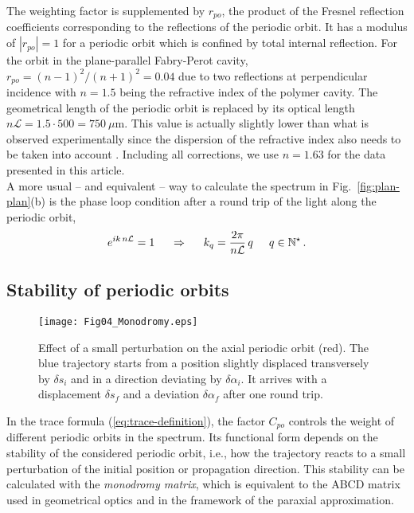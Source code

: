 \documentclass[10pt]{iopart}
\begin{document}
The weighting factor is supplemented by $r_{po}$, the product of the Fresnel reflection coefficients corresponding to the reflections of the periodic orbit. It has a modulus of $|r_{po}| = 1$ for a periodic orbit which is confined by total internal reflection. For the orbit in the plane-parallel Fabry-Perot cavity, $r_{po} = (n - 1)^2 / (n + 1)^2 = 0.04$ due to two reflections at perpendicular incidence with $n = 1.5$ being the refractive index of the polymer cavity. The geometrical length of the periodic orbit is replaced by its optical length $n \mathcal{L} = 1.5 \cdot 500 = 750~\mu$m. This value is actually slightly lower than what is observed experimentally since the dispersion of the refractive index also needs to be taken into account \cite{PRA-simples}. Including all corrections, we use $n = 1.63$ for the data presented in this article.\\

A more usual -- and equivalent -- way to calculate the spectrum in Fig.~\ref{fig:plan-plan}(b) is the phase loop condition after a round trip of the light along the periodic orbit,
\begin{equation} \label{eq:retour-en-phase}
e^{i k \, n \mathcal{L}} = 1 \hspace{0.5cm} \Rightarrow \hspace{0.5cm} k_q = \frac{2 \pi}{n \mathcal{L}} \, q \hspace{0.5cm} q \in \mathbb{N}^{\star} \, .
\end{equation}



\subsection{Stability of periodic orbits}\label{sec:stabilite}

\begin{figure}[tb]
\begin{center}
\texttt{[image: Fig04\_Monodromy.eps]}
\end{center}
\caption{Effect of a small perturbation on the axial periodic orbit (red). The blue trajectory starts from a position slightly displaced transversely by $\delta s_i$  and in a direction deviating by $\delta \alpha_i$. It arrives with a displacement $\delta s_f$ and a deviation $\delta \alpha_f$ after one round trip.}
\label{fig:monodromy}
\end{figure}

In the trace formula (\ref{eq:trace-definition}), the factor $C_{po}$ controls the weight of different periodic orbits in the spectrum. Its functional form depends on the stability of the considered periodic orbit, i.e., how the trajectory reacts to a small perturbation of the initial position or propagation direction. This stability can be calculated with the \emph{monodromy matrix}, which is equivalent to the ABCD matrix used in geometrical optics and in the framework of the paraxial approximation.\\
\end{document}
